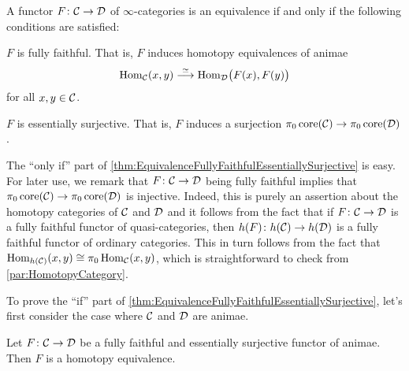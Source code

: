 \begin{thm}\label{thm:EquivalenceFullyFaithfulEssentiallySurjective}
	A functor $F\colon \mathcal{C}\rightarrow \mathcal{D}$ of $\infty$-categories is an equivalence if and only if the following conditions are satisfied:
	\begin{alphanumerate}
		\item $F$ is fully faithful. That is, $F$ induces homotopy equivalences of animae
		\begin{equation*}
			\operatorname{Hom}_{\mathcal{C}}(x,y)\overset{\simeq}{\longrightarrow}\operatorname{Hom}_{\mathcal{D}}\bigl(F(x),F(y)\bigr)
		\end{equation*}
		for all $x,y\in\mathcal{C}$.
		\item $F$ is essentially surjective. That is, $F$ induces a surjection $\pi_0\operatorname{core} (\mathcal{C})\rightarrow\pi_0\operatorname{core}(\mathcal{D})$.
	\end{alphanumerate}
\end{thm}
\begin{rem}\label{rem:FullyFaithfulImpliesInjectiveOnPi0Core}
	The \enquote{only if} part of \cref{thm:EquivalenceFullyFaithfulEssentiallySurjective} is easy. For later use, we remark that $F\colon \mathcal{C}\rightarrow\mathcal{D}$ being fully faithful implies that $\pi_0\operatorname{core}(\mathcal{C})\rightarrow\pi_0\operatorname{core}(\mathcal{D})$ is injective. %
	Indeed, this is purely an assertion about the homotopy categories of $\mathcal{C}$ and $\mathcal{D}$ and it follows from the fact that if $F\colon \mathcal{C}\rightarrow\mathcal{D}$ is a fully faithful functor of quasi-categories, then $h(F)\colon h(\mathcal{C})\rightarrow h(\mathcal{D})$ is a fully faithful functor of ordinary categories. This in turn follows from the fact that $\operatorname{Hom}_{h(\mathcal{C})}(x,y)\cong \pi_0\operatorname{Hom}_{\mathcal{C}}(x,y)$, which is straightforward to check from \cref{par:HomotopyCategory}.
\end{rem}
To prove the \enquote{if} part of \cref{thm:EquivalenceFullyFaithfulEssentiallySurjective}, let's first consider the case where $\mathcal{C}$ and $\mathcal{D}$ are animae.
\begin{lem}\label{lem:FullyFaithfulAnimae}
	Let $F\colon \mathcal{C}\rightarrow\mathcal{D}$ be a fully faithful and essentially surjective functor of animae. Then $F$ is a homotopy equivalence.
\end{lem}
